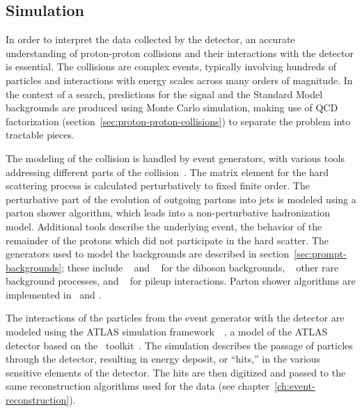 \subsection{Simulation}\label{sec:simulation}
In order to interpret the data collected by the detector, an accurate understanding of proton-proton collisions and their interactions with the detector is essential. The collisions are complex events, typically involving hundreds of particles and interactions with energy scales across many orders of magnitude. In the context of a search, predictions for the signal and the Standard Model backgrounds are produced using Monte Carlo simulation, making use of QCD factorization (section~\ref{sec:proton-proton-collisions}) to separate the problem into tractable pieces.

The modeling of the collision is handled by event generators, with various tools addressing different parts of the collision~\cite{Buckley:2011ms}. The matrix element for the hard scattering process is calculated perturbatively to fixed finite order. The perturbative part of the evolution of outgoing partons into jets is modeled using a parton shower algorithm, which leads into a non-perturbative hadronization model. Additional tools describe the underlying event, the behavior of the remainder of the protons which did not participate in the hard scatter. The generators used to model the backgrounds are described in section~\ref{sec:prompt-backgrounds}; these include \sherpa~\cite{sherpa} and \powheg~\cite{powheg} for the diboson backgrounds, \madgraph~\cite{madgraph} other rare background processes, and \pythia~\cite{pythia6,pythia8} for pileup interactions. Parton shower algorithms are implemented in \pythia\ and \sherpa. 

The interactions of the particles from the event generator with the detector are modeled using the ATLAS simulation framework~~\cite{TheATLASCollaboration:2010et}, a model of the ATLAS detector based on the \geant\ toolkit~\cite{Agostinelli:2002hh}. The simulation describes the passage of particles through the detector, resulting in energy deposit, or ``hits,'' in the various sensitive elements of the detector. The hits are then digitized and passed to the same reconstruction algorithms used for the data (see chapter~\ref{ch:event-reconstruction}). 



\printbibliography